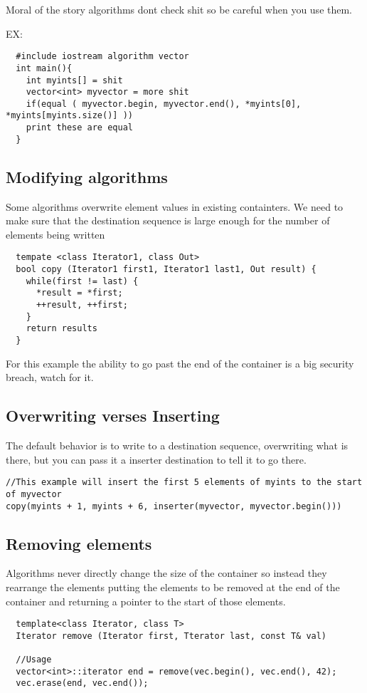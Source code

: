 \documentclass[12pt]{article}
\begin{document}
Moral of the story algorithms dont check shit so be careful when you use them.

EX:
\begin{lstlisting}
  #include iostream algorithm vector
  int main(){
    int myints[] = shit
    vector<int> myvector = more shit
    if(equal ( myvector.begin, myvector.end(), *myints[0], *myints[myints.size()] ))
    print these are equal
  }
\end{lstlisting}

\subsection*{Modifying algorithms}
Some algorithms overwrite element values in existing containters. We need to make sure that the destination sequence is large enough for the number of elements being written

\begin{lstlisting}
  tempate <class Iterator1, class Out>
  bool copy (Iterator1 first1, Iterator1 last1, Out result) {
    while(first != last) {
      *result = *first;
      ++result, ++first;
    }
    return results
  }
\end{lstlisting}
For this example the ability to go past the end of the container is a big security breach, watch for it.

\subsection*{Overwriting verses Inserting}
The default behavior is to write to a destination sequence, overwriting what is there, but you can pass it a inserter destination to tell it to go there.
\begin{lstlisting}
//This example will insert the first 5 elements of myints to the start of myvector
copy(myints + 1, myints + 6, inserter(myvector, myvector.begin()))
\end{lstlisting}


\subsection*{Removing elements}
Algorithms never directly change the size of the container so instead they rearrange the elements putting the elements to be removed at the end of the container and returning a pointer to the start of those elements.

\begin{lstlisting}
  template<class Iterator, class T>
  Iterator remove (Iterator first, Tterator last, const T& val)

  //Usage
  vector<int>::iterator end = remove(vec.begin(), vec.end(), 42);
  vec.erase(end, vec.end());
\end{lstlisting}
\end{document}
